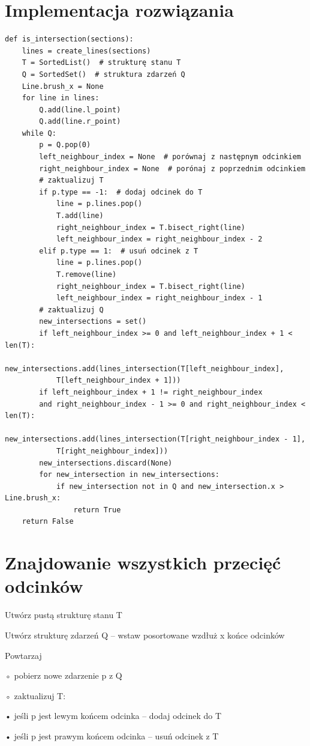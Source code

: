 \documentclass[12pt]{article}
\begin{document}
\section*{Implementacja rozwiązania}
\begin{Verbatim}
def is_intersection(sections):
	lines = create_lines(sections)
	T = SortedList()  # strukturę stanu T
	Q = SortedSet()  # struktura zdarzeń Q
	Line.brush_x = None
	for line in lines:
		Q.add(line.l_point)
		Q.add(line.r_point)
	while Q:
		p = Q.pop(0)
		left_neighbour_index = None  # porównaj z następnym odcinkiem
		right_neighbour_index = None  # porónaj z poprzednim odcinkiem
		# zaktualizuj T
		if p.type == -1:  # dodaj odcinek do T
			line = p.lines.pop()
			T.add(line)
			right_neighbour_index = T.bisect_right(line)
			left_neighbour_index = right_neighbour_index - 2
		elif p.type == 1:  # usuń odcinek z T
			line = p.lines.pop()
			T.remove(line)
			right_neighbour_index = T.bisect_right(line)
			left_neighbour_index = right_neighbour_index - 1
		# zaktualizuj Q
		new_intersections = set()
		if left_neighbour_index >= 0 and left_neighbour_index + 1 < len(T):
			new_intersections.add(lines_intersection(T[left_neighbour_index], 
			T[left_neighbour_index + 1]))
		if left_neighbour_index + 1 != right_neighbour_index 
		and right_neighbour_index - 1 >= 0 and right_neighbour_index < len(T):
			new_intersections.add(lines_intersection(T[right_neighbour_index - 1], 
			T[right_neighbour_index]))
		new_intersections.discard(None)
		for new_intersection in new_intersections:
			if new_intersection not in Q and new_intersection.x > Line.brush_x:
				return True
	return False
\end{Verbatim}

\newpage

\section*{Znajdowanie wszystkich przecięć odcinków}
Utwórz pustą strukturę stanu T

Utwórz strukturę zdarzeń Q – wstaw posortowane wzdłuż x końce odcinków

Powtarzaj

\quad ◦ pobierz nowe zdarzenie p z Q

\quad ◦ zaktualizuj T:

\quad \quad • jeśli p jest lewym końcem odcinka – dodaj odcinek do T

\quad \quad • jeśli p jest prawym końcem odcinka – usuń odcinek z T
\end{document}
